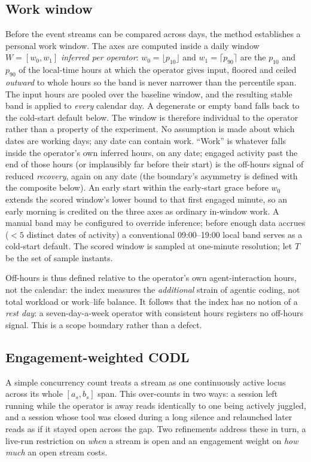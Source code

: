 \documentclass[10pt,twocolumn]{article}
\begin{document}
\subsection{Work window}
Before the event streams can be compared across days, the method establishes a
personal work window. The axes are computed inside a daily window
$W=[w_0,w_1]$ \emph{inferred per
operator}: $w_0=\lfloor p_{10}\rfloor$ and $w_1=\lceil p_{90}\rceil$ are the
$p_{10}$ and $p_{90}$ of the local-time hours at which the operator gives
input, floored and ceiled \emph{outward} to whole hours so the band is never
narrower than the percentile span. The input hours are pooled over the baseline
window, and the resulting stable band is applied to \emph{every} calendar day. A
degenerate or empty band falls back to the cold-start default below.
The window is therefore individual to the operator rather than a property of
the experiment. No assumption is made about which dates are working days; any
date can contain work. ``Work'' is whatever falls
inside the operator's own inferred hours, on any date; engaged activity past
the end of those hours (or implausibly far before their start) is the
off-hours signal of reduced \emph{recovery}, again on any date (the boundary's asymmetry
is defined with the composite below). An early start within the early-start
grace before $w_0$ extends the scored window's lower bound to that first engaged
minute, so an early morning is credited on the three axes as ordinary in-window
work. A manual band may be configured to override inference; before enough data accrues
($<5$ distinct dates of activity) a conventional 09:00--19:00 local band serves
as a cold-start default. The scored window is sampled at one-minute resolution;
let $T$ be the set of sample instants.

Off-hours is thus defined relative to the operator's own agent-interaction
hours, not the calendar: the index measures the \emph{additional} strain of
agentic coding, not total workload or work--life balance. It follows that the
index has no notion of a \emph{rest day}: a seven-day-a-week operator with
consistent hours registers no off-hours signal. This is a scope boundary
rather than a defect.

\subsection{Engagement-weighted CODL}\label{sec:codl}
A simple concurrency count treats a stream as one continuously active locus
across its whole $[a_s,b_s]$ span. This over-counts in two ways: a session left
running while the operator is away reads identically to one being actively
juggled, and a session whose tool was closed during a long silence and relaunched
later reads as if it stayed open across the gap. Two refinements address these in
turn, a live-run restriction on \emph{when} a stream is open and an engagement
weight on \emph{how much} an open stream costs.
\end{document}
